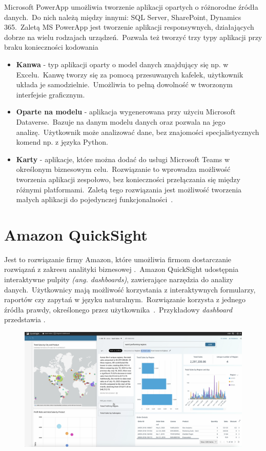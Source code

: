 Microsoft PowerApp umożliwia tworzenie aplikacji opartych o różnorodne źródła danych.\ Do nich należą między innymi: SQL Server, SharePoint, Dynamics 365.\ Zaletą MS PowerApp jest tworzenie aplikacji responsywnych, działających dobrze na wielu rodzajach urządzeń.\ Pozwala też tworzyć trzy typy aplikacji przy braku konieczności kodowania

\begin{itemize}
    \item \textbf{Kanwa} - typ aplikacji oparty o model danych znajdujący się np. w Excelu.\ Kanwę tworzy się za pomocą przesuwanych kafelek, użytkownik układa je samodzielnie.\ Umożliwia to pełną dowolność w tworzonym interfejsie graficznym.

    \item \textbf{Oparte na modelu} - aplikacja wygenerowana przy użyciu Microsoft Dataverse.\ Bazuje na danym modelu danych oraz pozwala na jego analizę.\ Użytkownik może analizować dane, bez znajomości specjalistycznych komend np. z języka Python.

    \item \textbf{Karty} - aplikacje, które można dodać do usługi Microsoft Teams w określonym biznesowym celu.\ Rozwiązanie to wprowadza możliwość tworzenia aplikacji zespołowo, bez konieczności przełączania się między różnymi platformami.\ Zaletą tego rozwiązania jest możliwość tworzenia małych aplikacji do pojedynczej funkcjonalności~\cite{Microsoft,Microsofta, Microsoftb, Microsoftc}.
\end{itemize}

\section{Amazon QuickSight}
Jest to rozwiązanie firmy Amazon, które umożliwia firmom dostarczanie rozwiązań z zakresu analityki biznesowej .\ Amazon QuickSight udostępnia interaktywne pulpity \textit{(ang. dashboards)}, zawierające narzędzia do analizy danych.\ Użytkownicy mają możliwość korzystania z interaktywnych formularzy, raportów czy zapytań w języku naturalnym.\ Rozwiązanie korzysta z jednego źródła prawdy, określonego przez użytkownika~\cite{AmazonQuickSight}.\ Przykładowy \textit{dashboard} przedstawia .
\begin{figure}[H]
    \centering
    \includegraphics[width=\textwidth]{images/amazon_qs}
    \label{fig:am-qs}
\end{figure}
\vfill
\clearpage

